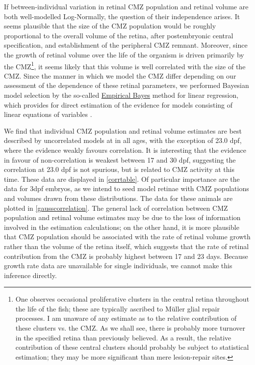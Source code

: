 If between-individual variation in retinal CMZ population and retinal volume are both well-modelled Log-Normally, the question of their independence arises. It seems plausible that the size of the CMZ population would be roughly proportional to the overall volume of the retina, after postembryonic central specification, and establishment of the peripheral CMZ remnant. Moreover, since the growth of retinal volume over the life of the organism is driven primarily by the CMZ\footnote{One observes occasional proliferative clusters in the central retina throughout the life of the fish; these are typically ascribed to M\"{u}ller glial repair processes. I am unaware of any estimate as to the relative contribution of these clusters vs. the CMZ. As we shall see, there is probably more turnover in the specified retina than previously believed. As a result, the relative contribution of these central clusters should probably be subject to statistical estimation; they may be more significant than mere lesion-repair sites.}, it seems likely that this volume is well correlated with the size of the CMZ. Since the manner in which we model the CMZ differ depending on our assessment of the dependence of these retinal parameters, we performed Bayesian model selection by the so-called \hyperref[ssec:EmpiricalBayes]{Empirical Bayes} method for linear regression, which provides for direct estimation of the evidence for models consisting of linear equations of variables \cite{Bishop2006}.

We find that individual CMZ population and retinal volume estimates are best described by uncorrelated models at in all ages, with the exception of 23.0 dpf, where the evidence weakly favours correlation. It is interesting that the evidence in favour of non-correlation is weakest between 17 and 30 dpf, suggesting the correlation at 23.0 dpf is not spurious, but is related to CMZ activity at this time. These data are displayed in \autoref{corrtable}. Of particular importance are the data for 3dpf embryos, as we intend to seed model retinae with CMZ populations and volumes drawn from these distributions. The data for these animals are plotted in \autoref{gausscorrelation}. The general lack of correlation between CMZ population and retinal volume estimates may be due to the loss of information involved in the estimation calculations; on the other hand, it is more plausible that CMZ population should be associated with the rate of retinal volume growth rather than the volume of the retina itself, which suggests that the rate of retinal contribution from the CMZ is probably highest between 17 and 23 days. Because growth rate data are unavailable for single individuals, we cannot make this inference directly.

